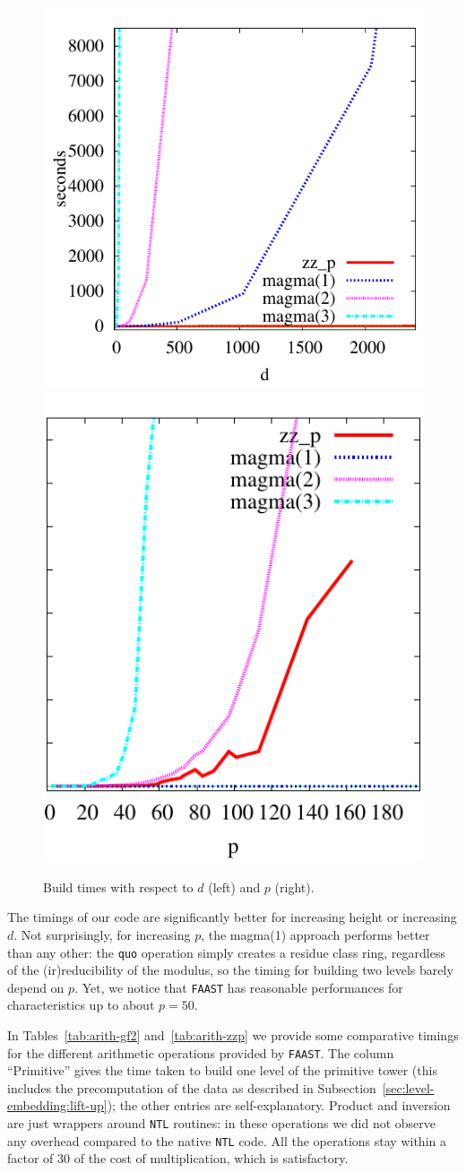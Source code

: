 \begin{figure}
  \centering
  \includegraphics[height=0.5\textwidth]{artin/build-d}
  \includegraphics[height=0.5\textwidth]{artin/build-p}
  
  \caption{Build times with respect to $d$ (left) and $p$ (right).}
  \label{fig:p-d}
\end{figure}

The timings of our code are significantly better for increasing height
or increasing $d$. Not surprisingly, for increasing $p$, the magma(1)
approach performs better than any other: the {\tt quo} operation
simply creates a residue class ring, regardless of the
(ir)reducibility of the modulus, so the timing for building two levels
barely depend on $p$. Yet, we notice that \texttt{FAAST} has
reasonable performances for characteristics up to about $p=50$.

In Tables~\ref{tab:arith-gf2} and~\ref{tab:arith-zzp} we provide some
comparative timings for the different arithmetic operations provided
by \texttt{FAAST}. The column ``Primitive'' gives the time taken to
build one level of the primitive tower (this includes the
precomputation of the data as described in
Subsection~\ref{sec:level-embedding:lift-up}); the other entries are
self-explanatory. Product and inversion are just wrappers around
\texttt{NTL} routines: in these operations we did not observe any
overhead compared to the native \texttt{NTL} code. All the operations
stay within a factor of $30$ of the cost of multiplication, which is
satisfactory.


